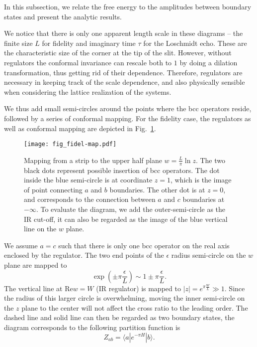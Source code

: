 
In this subsection, we relate the free energy to the amplitudes between boundary states and present the analytic results. 

We notice that there is only one apparent length scale in these diagrams -- the finite size $L$ for fidelity and imaginary time $\tau$ for the Loschmidt echo. These are the characteristic size of the corner at the tip of the slit. However, without regulators the conformal invariance can rescale both to $1$ by doing a dilation transformation, thus getting rid of their dependence. Therefore, regulators are necessary in keeping track of the scale dependence, and also physically sensible when considering the lattice realization of the systems. 

We thus add small semi-circles around the points where the bcc operators reside, followed by a series of conformal mapping. For the fidelity case, the regulators as well as conformal mapping are depicted in Fig.~\ref{fig:fidel-map}. 
\begin{figure}[h]
\centering
\texttt{[image: fig\_fidel-map.pdf]}
\caption{Mapping from a strip to the upper half plane $w = \frac{L}{\pi} \ln z $. The two black dots represent possible insertion of bcc operators. The dot inside the blue semi-circle is at coordinate $z = 1$, which is the image of point connecting $a$ and $b$ boundaries. The other dot is at $z = 0$, and corresponds to the connection between $a$ and $c$ boundaries at $- \infty$. To evaluate the diagram, we add the outer-semi-circle as the IR cut-off, it can also be regarded as the image of the blue vertical line on the $w$ plane.}
\label{fig:fidel-map}
\end{figure}
We assume $a = c$ such that there is only one bcc operator on the real axis enclosed by the regulator. The two end points of the $\epsilon$ radius semi-circle on the $w$ plane are mapped to
\begin{equation}
\exp( \pm \pi \frac{\epsilon}{ L}  ) \sim 1 \pm \pi \frac{\epsilon}{L} .
\end{equation}
The vertical line at $\text{Re} w = W$ (IR regulator) is mapped to $|z| = e^{\pi \frac{W}{L} } \gg 1 $. Since the radius of this larger circle is overwhelming, moving the inner semi-circle on the $z$ plane to the center will not affect the cross ratio to the leading order. The dashed line and solid line can then be regarded as two boundary states, the diagram corresponds to the following partition function is 
\begin{equation}
  Z_{ab} = \langle a | e^{-\pi H } |b \rangle .
\end{equation}



